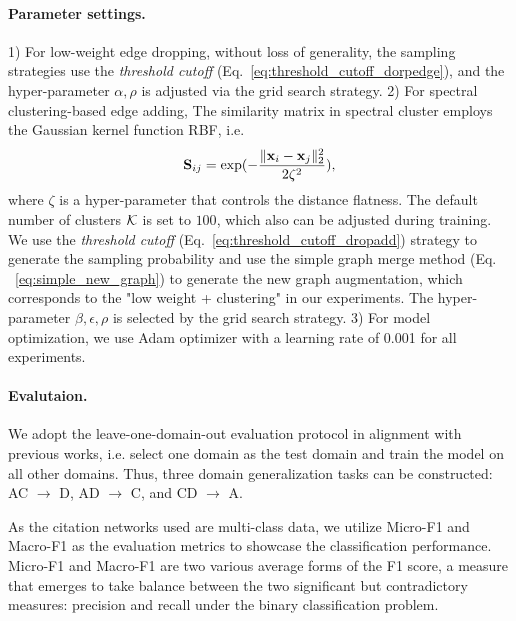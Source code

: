 \paragraph{Parameter settings.}
1) For low-weight edge dropping, without loss of generality, the sampling strategies use the \textit{threshold cutoff} (Eq.~\eqref{eq:threshold_cutoff_dorpedge}), and the hyper-parameter $\alpha,\rho$ is adjusted via the grid search strategy.
2) For spectral clustering-based edge adding,
The similarity matrix in spectral cluster employs the 
Gaussian kernel function RBF, i.e.
\begin{align}
    \mathbf{S}_{ij}=\exp(-\frac{\|\mathbf{x}_i-\mathbf{x}_j\|_2^2}{2\zeta^2}),
\end{align}
where $\zeta$ is a hyper-parameter that controls the distance flatness.
 The default number of clusters $\mathcal{K}$ is set to $100$, which also can be adjusted during training. 
 We use the \textit{threshold cutoff} (Eq.~\eqref{eq:threshold_cutoff_dropadd}) strategy to generate the sampling probability and use the simple graph merge method (Eq. ~\eqref{eq:simple_new_graph}) to generate the new graph augmentation, which corresponds to the "low weight + clustering" in our experiments.
 The hyper-parameter $\beta, \epsilon, \rho$ is selected by the grid search strategy. 3) For model optimization, we use Adam optimizer with a learning rate of 0.001 for all experiments.



\paragraph{Evalutaion.} We adopt the leave-one-domain-out evaluation protocol in alignment with previous works\cite{xu2021fourier}, i.e. select one domain as the test domain and train the model on all other domains. Thus, three domain generalization tasks can be constructed: AC $\rightarrow$ D, AD $\rightarrow$ C, and CD $\rightarrow$ A.

As the citation networks used are multi-class data, we utilize Micro-F1 and Macro-F1 as the evaluation metrics to showcase the classification performance.
Micro-F1 and Macro-F1 are two  various average forms of the F1 score, a measure that emerges to take balance between the two significant but contradictory measures: precision and recall under the binary classification problem. 


